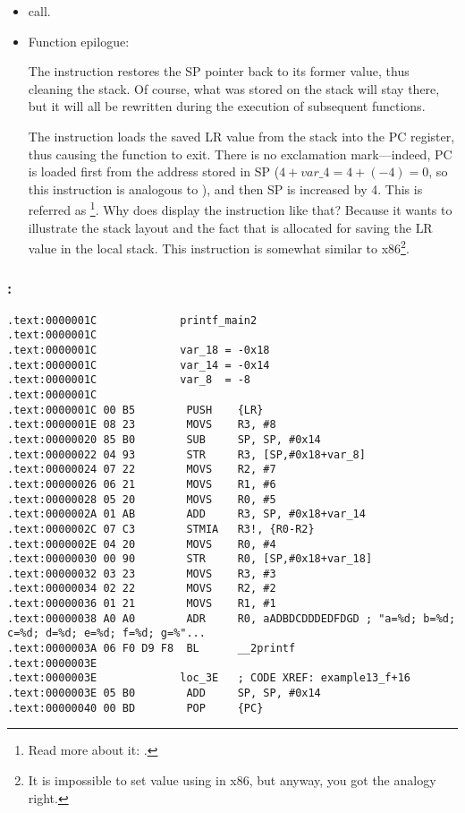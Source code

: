 \begin{itemize}
\item \printf call.

\item Function epilogue:

The  instruction restores the \ac{SP} pointer back to its former value, thus cleaning the stack.
Of course, what was stored on the stack will stay there, but it will all be rewritten during the execution of subsequent functions.

The  instruction loads the saved \ac{LR} value from the stack into the \ac{PC} register, thus causing the function to exit.
There is no exclamation mark---indeed, \ac{PC} is loaded first from the address stored in \ac{SP} ($4+var\_4=4+(-4)=0$, so this instruction is analogous to ), and then \ac{SP} is increased by 4.
This is referred as \footnote{Read more about it: .}.
Why does \IDA display the instruction like that?
Because it wants to illustrate the stack layout and the fact that  is allocated for saving the \ac{LR} value in the local stack.
This instruction is somewhat similar to  \InENRU x86\footnote{It is impossible to set  value using \POP in x86, but anyway, you got the analogy right.}.

\end{itemize}

\subsubsection{\OptimizingKeilVI: \ThumbMode}

\begin{lstlisting}
.text:0000001C             printf_main2
.text:0000001C
.text:0000001C             var_18 = -0x18
.text:0000001C             var_14 = -0x14
.text:0000001C             var_8  = -8
.text:0000001C
.text:0000001C 00 B5        PUSH    {LR}
.text:0000001E 08 23        MOVS    R3, #8
.text:00000020 85 B0        SUB     SP, SP, #0x14
.text:00000022 04 93        STR     R3, [SP,#0x18+var_8]
.text:00000024 07 22        MOVS    R2, #7
.text:00000026 06 21        MOVS    R1, #6
.text:00000028 05 20        MOVS    R0, #5
.text:0000002A 01 AB        ADD     R3, SP, #0x18+var_14
.text:0000002C 07 C3        STMIA   R3!, {R0-R2}
.text:0000002E 04 20        MOVS    R0, #4
.text:00000030 00 90        STR     R0, [SP,#0x18+var_18]
.text:00000032 03 23        MOVS    R3, #3
.text:00000034 02 22        MOVS    R2, #2
.text:00000036 01 21        MOVS    R1, #1
.text:00000038 A0 A0        ADR     R0, aADBDCDDDEDFDGD ; "a=%d; b=%d; c=%d; d=%d; e=%d; f=%d; g=%"...
.text:0000003A 06 F0 D9 F8  BL      __2printf
.text:0000003E
.text:0000003E             loc_3E   ; CODE XREF: example13_f+16
.text:0000003E 05 B0        ADD     SP, SP, #0x14
.text:00000040 00 BD        POP     {PC}
\end{lstlisting}

